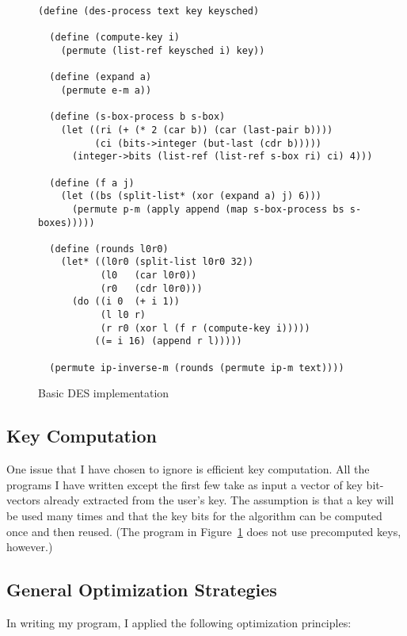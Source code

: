\begin{figure}[hbt]
\begin{verbatim}
(define (des-process text key keysched)

  (define (compute-key i)
    (permute (list-ref keysched i) key))

  (define (expand a)
    (permute e-m a))

  (define (s-box-process b s-box)
    (let ((ri (+ (* 2 (car b)) (car (last-pair b))))
          (ci (bits->integer (but-last (cdr b)))))
      (integer->bits (list-ref (list-ref s-box ri) ci) 4)))

  (define (f a j)
    (let ((bs (split-list* (xor (expand a) j) 6)))
      (permute p-m (apply append (map s-box-process bs s-boxes)))))

  (define (rounds l0r0)
    (let* ((l0r0 (split-list l0r0 32))
           (l0   (car l0r0))
           (r0   (cdr l0r0)))
      (do ((i 0  (+ i 1))
           (l l0 r)
           (r r0 (xor l (f r (compute-key i)))))
          ((= i 16) (append r l)))))

  (permute ip-inverse-m (rounds (permute ip-m text))))
\end{verbatim}
\caption{Basic DES implementation}
\label{fig:basic-program}
\end{figure}


\subsection{Key Computation}

One issue that I have chosen to ignore is efficient key computation.
All the programs I have written except the first few take as input a
vector of key bit-vectors already extracted from the user's key.  The
assumption is that a key will be used many times and that the key bits
for the algorithm can be computed once and then reused.  (The program in
Figure~\ref{fig:basic-program} does not use precomputed keys, however.)


\subsection{General Optimization Strategies}

In writing my program, I applied the following optimization principles:

